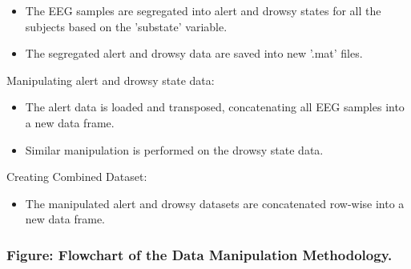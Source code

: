 \documentclass[letterpaper]{article}
\begin{document}
\begin{itemize}[series=listWWNumi,label=[F0B7?]]
\item The EEG samples are segregated into alert and drowsy states for all the subjects based on the 'substate' variable.
\item The segregated alert and drowsy data are saved into new '.mat' files.
\end{itemize}
Manipulating alert and drowsy state data:

\begin{itemize}[series=listWWNumii,label=[F0B7?]]
\item The alert data is loaded and transposed, concatenating all EEG samples into a new data frame.
\item Similar manipulation is performed on the drowsy state data.
\end{itemize}
Creating Combined Dataset:

\begin{itemize}[series=listWWNumiii,label=[F0B7?]]
\item The manipulated alert and drowsy datasets are concatenated row-wise into a new data frame.
\end{itemize}
\centering
{}
\par
\subsubsection[Figure: Flowchart of the Data Manipulation Methodology.]{\textbf{Figure: }Flowchart of the Data
Manipulation Methodology.}
\end{document}
